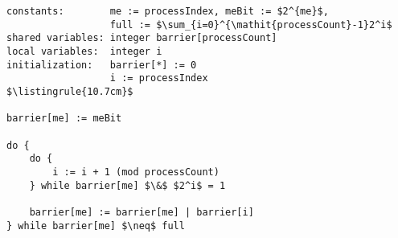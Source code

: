 \begin{center}
\begin{minipage}{\textwidth}
\begin{lstlisting}[mathescape, linewidth=10.7cm]
constants:        me := processIndex, meBit := $2^{me}$,
                  full := $\sum_{i=0}^{\mathit{processCount}-1}2^i$
shared variables: integer barrier[processCount]
local variables:  integer i
initialization:   barrier[*] := 0
                  i := processIndex
$\listingrule{10.7cm}$

barrier[me] := meBit

do {
	do {
		i := i + 1 (mod processCount)
	} while barrier[me] $\&$ $2^i$ = 1

	barrier[me] := barrier[me] | barrier[i]
} while barrier[me] $\neq$ full
\end{lstlisting}
\end{minipage}
\end{center}

